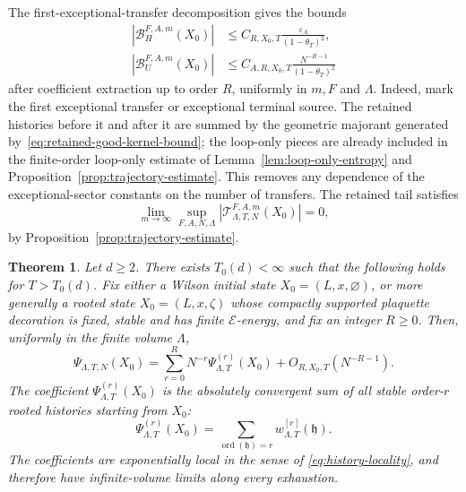 \documentclass[11pt,a4paper,reqno]{amsart}
\newtheorem{theorem}{Theorem}[section]
\theoremstyle{definition}
\theoremstyle{remark}
\begin{document}
The first-exceptional-transfer decomposition gives the bounds
\begin{align}
\label{eq:first-exceptional-stable-bound}
|\mathcal B^{F,A,m}_{H}(X_0)|
&\le C_{R,X_0,T}\frac{\varepsilon_A}{(1-\theta_T)^2},\\
\label{eq:first-exceptional-unstable-bound}
|\mathcal B^{F,A,m}_{U}(X_0)|
&\le C_{A,R,X_0,T}\frac{N^{-R-1}}{(1-\theta_T)^2}
\end{align}
after coefficient extraction up to order $R$, uniformly in $m,F$ and $\Lambda$.  Indeed, mark the first exceptional transfer or exceptional terminal source.  The retained histories before it and after it are summed by the geometric majorant generated by~\eqref{eq:retained-good-kernel-bound}; the loop-only pieces are already included in the finite-order loop-only estimate of Lemma~\ref{lem:loop-only-entropy} and Proposition~\ref{prop:trajectory-estimate}.  This removes any dependence of the exceptional-sector constants on the number of transfers.  The retained tail satisfies
\begin{equation}
\label{eq:retained-history-tail-bound}
\lim_{m\to\infty}\sup_{F,A,N,\Lambda}
|\mathcal T^{F,A,m}_{\Lambda,T,N}(X_0)|=0,
\end{equation}
by Proposition~\ref{prop:trajectory-estimate}.

\begin{theorem}\label{thm:rooted-coeff-construction}
Let $d\ge2$.  There exists $T_0(d)<\infty$ such that the following holds for $T>T_0(d)$.  Fix either a Wilson initial state $X_0=(L,x,\varnothing)$, or more generally a rooted state $X_0=(L,x,\zeta)$ whose compactly supported plaquette decoration is fixed, stable and has finite $\mathcal E$-energy, and fix an integer $R\ge0$.  Then, uniformly in the finite volume $\Lambda$,
\begin{equation}\label{eq:rooted-asymptotic-expansion}
\Psi_{\Lambda,T,N}(X_0)
=
\sum_{r=0}^R N^{-r}\Psi^{(r)}_{\Lambda,T}(X_0)
+
O_{R,X_0,T}(N^{-R-1}).
\end{equation}
The coefficient $\Psi^{(r)}_{\Lambda,T}(X_0)$ is the absolutely convergent sum of all stable order-$r$ rooted histories starting from $X_0$:
\begin{equation}\label{eq:rooted-history-coeff}
\Psi^{(r)}_{\Lambda,T}(X_0)
=
\sum_{\operatorname{ord}(\mathfrak h)=r}w^{[r]}_{\Lambda,T}(\mathfrak h).
\end{equation}
The coefficients are exponentially local in the sense of \eqref{eq:history-locality}, and therefore have infinite-volume limits along every exhaustion.
\end{theorem}
\end{document}
